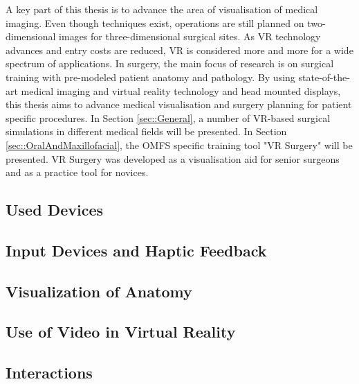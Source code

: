 A key part of this thesis is to advance the area of visualisation of medical imaging.
Even though techniques exist, operations are still planned on two-dimensional images for three-dimensional surgical sites.
\newline
As VR technology advances and entry costs are reduced, VR is considered more and more for a wide spectrum of applications.
In surgery, the main focus of research is on surgical training with pre-modeled patient anatomy and pathology.
By using state-of-the-art medical imaging and virtual reality technology and head mounted displays, this thesis aims to advance medical visualisation and surgery planning for patient specific procedures.
In Section \ref{sec::General}, a number of VR-based surgical simulations in different medical fields will be presented.
In Section \ref{sec::OralAndMaxillofacial}, the OMFS specific training tool "VR Surgery" will be presented.
VR Surgery was developed as a visualisation aid for senior surgeons and as a practice tool for novices.

\subsection{\label{sec::Devices}Used Devices}


\subsection{\label{sec::Input}Input Devices and Haptic Feedback}


\subsection{\label{sec::Visualization}Visualization of Anatomy}


\subsection{\label{sec::Video}Use of Video in Virtual Reality}


\subsection{\label{sec::Interactions}Interactions}


